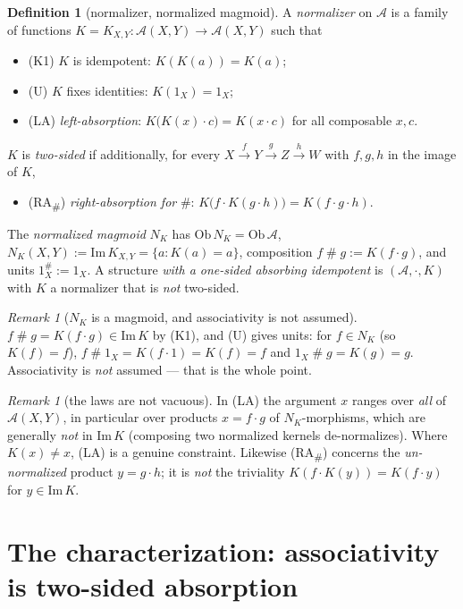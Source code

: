 \documentclass[11pt]{amsart}
\theoremstyle{plain}
\theoremstyle{definition}
\newtheorem{definition}[theorem]{Definition}
\theoremstyle{remark}
\newtheorem{remark}[theorem]{Remark}
\newcommand{\Img}{\mathrm{Im}\,}
\newcommand{\sh}{\mathbin{\#}}
\newcommand{\LA}{\textsf{(LA)}}
\newcommand{\RA}{\textsf{(RA}\textsubscript{\#}\textsf{)}}
\begin{document}
\begin{definition}[normalizer, normalized magmoid]
\label{def:normalizer}
A \emph{normalizer} on $\mathcal{A}$ is a family of functions
$K=K_{X,Y}\colon\mathcal{A}(X,Y)\to\mathcal{A}(X,Y)$ such that
\begin{itemize}
  \item \textsf{(K1)} $K$ is idempotent: $K(K(a))=K(a)$;
  \item \textsf{(U)} $K$ fixes identities: $K(1_{X})=1_{X}$;
  \item \LA{} \emph{left-absorption}: $K\big(K(x)\cdot c\big)=K(x\cdot c)$ for all composable $x,c$.
\end{itemize}
$K$ is \emph{two-sided} if additionally, for every $X\xrightarrow{f}Y\xrightarrow{g}Z\xrightarrow{h}W$
with $f,g,h$ in the image of $K$,
\begin{itemize}
  \item \RA{} \emph{right-absorption for} $\sh$: $K\big(f\cdot K(g\cdot h)\big)=K(f\cdot g\cdot h)$.
\end{itemize}
The \emph{normalized magmoid} $N_{K}$ has $\mathrm{Ob}\,N_{K}=\mathrm{Ob}\,\mathcal{A}$,
$N_{K}(X,Y):=\Img K_{X,Y}=\{a:K(a)=a\}$, composition $f\sh g:=K(f\cdot g)$, and units
$1^{\sh}_{X}:=1_{X}$. A structure \emph{with a one-sided absorbing idempotent} is
$(\mathcal{A},\cdot,K)$ with $K$ a normalizer that is \emph{not} two-sided.
\end{definition}

\begin{remark}[$N_K$ is a magmoid, and associativity is not assumed]
\label{rem:welldef}
$f\sh g=K(f\cdot g)\in\Img K$ by \textsf{(K1)}, and \textsf{(U)} gives units: for $f\in N_{K}$ (so
$K(f)=f$), $f\sh 1_{X}=K(f\cdot 1)=K(f)=f$ and $1_{X}\sh g=K(g)=g$. Associativity is \emph{not}
assumed --- that is the whole point.
\end{remark}

\begin{remark}[the laws are not vacuous]
\label{rem:nonvac}
In \LA{} the argument $x$ ranges over \emph{all} of $\mathcal{A}(X,Y)$, in particular over products
$x=f\cdot g$ of $N_{K}$-morphisms, which are generally \emph{not} in $\Img K$ (composing two
normalized kernels de-normalizes). Where $K(x)\ne x$, \LA{} is a genuine constraint. Likewise \RA{}
concerns the \emph{un-normalized} product $y=g\cdot h$; it is \emph{not} the triviality
$K(f\cdot K(y))=K(f\cdot y)$ for $y\in\Img K$.
\end{remark}

\section{The characterization: associativity is two-sided absorption}
\label{sec:char}
\end{document}
